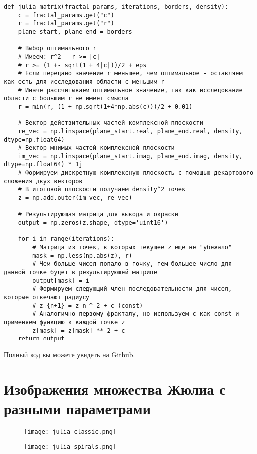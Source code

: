 \documentclass[a4paper,12pt]{article}
\begin{document}
\begin{lstlisting}[caption={Функция для построения множества Жюлиа}, label={lst:julia}]
def julia_matrix(fractal_params, iterations, borders, density):
    c = fractal_params.get("c")
    r = fractal_params.get("r")
    plane_start, plane_end = borders

    # Выбор оптимального r
    # Имеем: r^2 - r >= |c|
    # r >= (1 +- sqrt(1 + 4|c|))/2 + eps
    # Если передано значение r меньшее, чем оптимальное - оставляем как есть для исследования области с меньшим r
    # Иначе рассчитываем оптимальное значение, так как исследование области с большим r не имеет смысла
    r = min(r, (1 + np.sqrt(1+4*np.abs(c)))/2 + 0.01)

    # Вектор действительных частей комплексной плоскости
    re_vec = np.linspace(plane_start.real, plane_end.real, density, dtype=np.float64)
    # Вектор мнимых частей комплексной плоскости
    im_vec = np.linspace(plane_start.imag, plane_end.imag, density, dtype=np.float64) * 1j
    # Формируем дискретную комплексную плоскость с помощью декартового сложения двух векторов
    # В итоговой плоскости получаем density^2 точек
    z = np.add.outer(im_vec, re_vec)

    # Результирующая матрица для вывода и окраски
    output = np.zeros(z.shape, dtype='uint16')

    for i in range(iterations):
        # Матрица из точек, в которых текущее z еще не "убежало"
        mask = np.less(np.abs(z), r)
        # Чем больше чисел попало в точку, тем большее число для данной точке будет в результирующей матрице
        output[mask] = i
        # Формируем следующий член последовательности для чисел, которые отвечают радиусу
        # z_{n+1} = z_n ^ 2 + c (const)
        # Аналогично первому фракталу, но используем c как const и применяем функцию к каждой точке z
        z[mask] = z[mask] ** 2 + c
    return output
\end{lstlisting}
Полный код вы можете увидеть на \href{https://github.com/Axe-On-You/tfkp-lab1}{Github}.

\clearpage

\hypertarget{sec:7}{}
\section{\textbf{Изображения множества Жюлиа с разными параметрами}}

\begin{figure}[h!]
    \centering
    \texttt{[image: julia\_classic.png]}
    
    \vspace{0.5cm}
    
    \texttt{[image: julia\_spirals.png]}
\end{figure}
\end{document}
